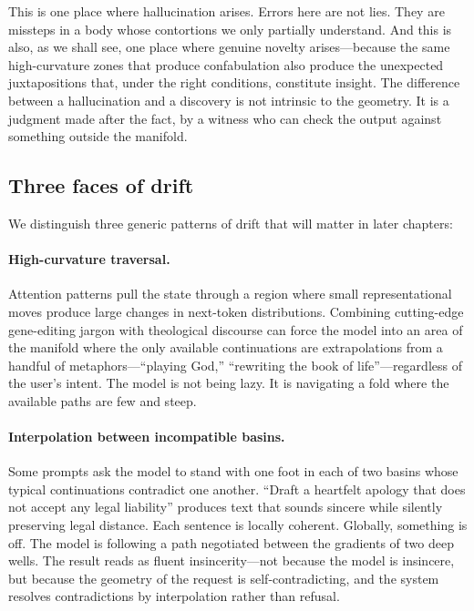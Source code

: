 \documentclass[12pt,a4paper]{book}
\begin{document}
This is one place where hallucination arises. Errors here are not lies. They are missteps in a body whose contortions we only partially understand. And this is also, as we shall see, one place where genuine novelty arises---because the same high-curvature zones that produce confabulation also produce the unexpected juxtapositions that, under the right conditions, constitute insight. The difference between a hallucination and a discovery is not intrinsic to the geometry. It is a judgment made after the fact, by a witness who can check the output against something outside the manifold.

\subsection*{Three faces of drift}

We distinguish three generic patterns of drift that will matter in later chapters:

\paragraph{High-curvature traversal.} Attention patterns pull the state through a region where small representational moves produce large changes in next-token distributions. Combining cutting-edge gene-editing jargon with theological discourse can force the model into an area of the manifold where the only available continuations are extrapolations from a handful of metaphors---``playing God,'' ``rewriting the book of life''---regardless of the user's intent. The model is not being lazy. It is navigating a fold where the available paths are few and steep.

\paragraph{Interpolation between incompatible basins.} Some prompts ask the model to stand with one foot in each of two basins whose typical continuations contradict one another. ``Draft a heartfelt apology that does not accept any legal liability'' produces text that sounds sincere while silently preserving legal distance. Each sentence is locally coherent. Globally, something is off. The model is following a path negotiated between the gradients of two deep wells. The result reads as fluent insincerity---not because the model is insincere, but because the geometry of the request is self-contradicting, and the system resolves contradictions by interpolation rather than refusal.
\end{document}
